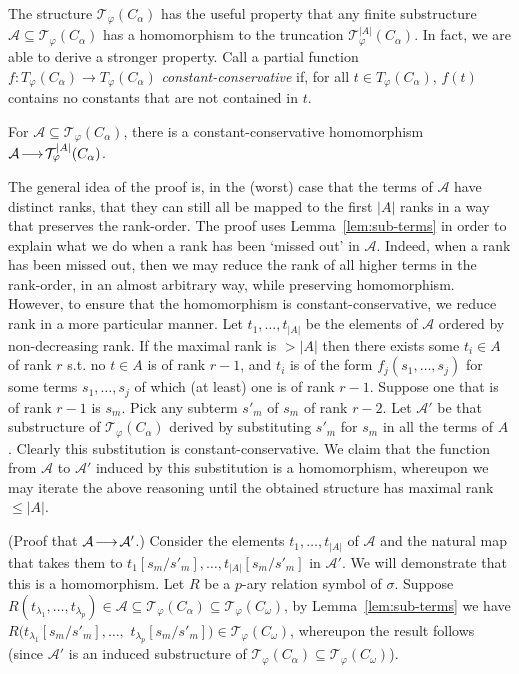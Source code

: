 \documentclass{LMCS}
\newcommand{\homm}{
  \ensuremath{
      \negthinspace 
      \longrightarrow
      \negthinspace
  }
}
\begin{document}
The structure $\mathcal{T}_\varphi(C_\alpha)$ has the useful property that any finite substructure $\mathcal{A} \subseteq \mathcal{T}_\varphi(C_\alpha)$ has a homomorphism to the truncation $\mathcal{T}^{|A|}_\varphi(C_\alpha)$. In fact, we are able to derive a stronger property. Call a partial function $f:{T}_\varphi(C_\alpha) \rightarrow {T}_\varphi(C_\alpha)$ \emph{constant-conservative} if, for all $t \in {T}_\varphi(C_\alpha)$, $f(t)$ contains no constants that are not contained in $t$.
\begin{lem}
\label{lem:AhomT}
For $\mathcal{A} \subseteq \mathcal{T}_\varphi(C_\alpha)$, there is a constant-conservative homomorphism $\mathcal{A} \homm \mathcal{T}^{|A|}_\varphi(C_\alpha)$.
\end{lem}
\noindent The general idea of the proof is, in the (worst) case that the terms of $\mathcal{A}$ have distinct ranks, that they can still all be mapped to the first ${|A|}$ ranks in a way that preserves the rank-order. The proof uses Lemma~\ref{lem:sub-terms} in order to explain what we do when a rank has been `missed out' in $\mathcal{A}$. Indeed, when a rank has been missed out, then we may reduce the rank of all higher terms in the rank-order, in an almost arbitrary way, while preserving homomorphism. However, to ensure that the homomorphism is constant-conservative, we reduce rank in a more particular manner. 
\proof
Let $t_1,\ldots,t_{|A|}$ be the elements of $\mathcal{A}$ ordered by non-decreasing rank. If the maximal rank is $> {|A|}$ then there exists some $t_i \in A$ of rank $r$ s.t. no $t \in A$ is of rank $r-1$, and $t_i$ is of the form $f_j(s_1,\ldots,s_j)$ for some terms $s_1,\ldots,s_j$ of which (at least) one is of rank $r-1$. Suppose one that is of rank $r-1$ is $s_m$. Pick any subterm $s'_m$ of $s_m$ of rank $r-2$. Let $\mathcal{A}'$ be that substructure of $\mathcal{T}_\varphi(C_\alpha)$ derived by substituting $s'_m$ for $s_m$ in all the terms of $A$. Clearly this substitution is constant-conservative. We claim that the function from $\mathcal{A}$ to $\mathcal{A}'$ induced by this substitution is a homomorphism, whereupon we may iterate the above reasoning until the obtained structure has maximal rank $\leq {|A|}$.

(Proof that $\mathcal{A} \homm \mathcal{A}'$.) 
Consider the elements $t_1,\ldots,t_{|A|}$ of $\mathcal{A}$ and the natural map that takes them to $t_1[s_m/s'_m], \ldots,t_{|A|}[s_m/s'_m]$ in $\mathcal{A}'$. We will demonstrate that this is a homomorphism. Let $R$ be a $p$-ary relation symbol of $\sigma$. 
Suppose $R(t_{\lambda_1},\ldots,t_{\lambda_p}) \in \mathcal{A} \subseteq \mathcal{T}_\varphi(C_\alpha) \subseteq \mathcal{T}_\varphi(C_\omega)$, by Lemma~\ref{lem:sub-terms} we have $R(t_{\lambda_1}[s_m/s'_m],\ldots,$ $t_{\lambda_p}[s_m/s'_m]) \in \mathcal{T}_\varphi(C_\omega)$, whereupon the result follows (since $\mathcal{A}'$ is an induced substructure of $\mathcal{T}_\varphi(C_\alpha) \subseteq \mathcal{T}_\varphi(C_\omega)$).
\end{document}
